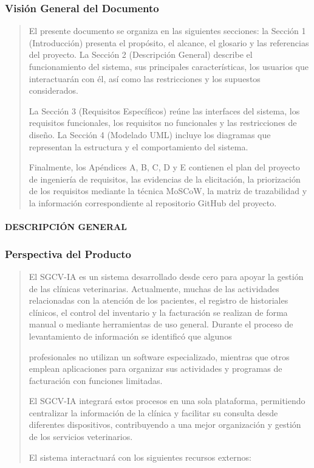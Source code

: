 \documentclass[
]{article}
\begin{document}
\subsubsection{Visión General del
Documento}\label{visiuxf3n-general-del-documento}

\begin{quote}
El presente documento se organiza en las siguientes secciones: la
Sección 1 (Introducción) presenta el propósito, el alcance, el glosario
y las referencias del proyecto. La Sección 2 (Descripción General)
describe el funcionamiento del sistema, sus principales características,
los usuarios que interactuarán con él, así como las restricciones y los
supuestos considerados.

La Sección 3 (Requisitos Específicos) reúne las interfaces del sistema,
los requisitos funcionales, los requisitos no funcionales y las
restricciones de diseño. La Sección 4 (Modelado UML) incluye los
diagramas que representan la estructura y el comportamiento del sistema.

Finalmente, los Apéndices A, B, C, D y E contienen el plan del proyecto
de ingeniería de requisitos, las evidencias de la elicitación, la
priorización de los requisitos mediante la técnica MoSCoW, la matriz de
trazabilidad y la información correspondiente al repositorio GitHub del
proyecto.
\end{quote}

\paragraph{DESCRIPCIÓN GENERAL}\label{descripciuxf3n-general-1}

\subsubsection{Perspectiva del Producto}\label{perspectiva-del-producto}

\begin{quote}
El SGCV-IA es un sistema desarrollado desde cero para apoyar la gestión
de las clínicas veterinarias. Actualmente, muchas de las actividades
relacionadas con la atención de los pacientes, el registro de
historiales clínicos, el control del inventario y la facturación se
realizan de forma manual o mediante herramientas de uso general. Durante
el proceso de levantamiento de información se identificó que algunos

profesionales no utilizan un software especializado, mientras que otros
emplean aplicaciones para organizar sus actividades y programas de
facturación con funciones limitadas.

El SGCV-IA integrará estos procesos en una sola plataforma, permitiendo
centralizar la información de la clínica y facilitar su consulta desde
diferentes dispositivos, contribuyendo a una mejor organización y
gestión de los servicios veterinarios.

El sistema interactuará con los siguientes recursos externos:
\end{quote}
\end{document}
